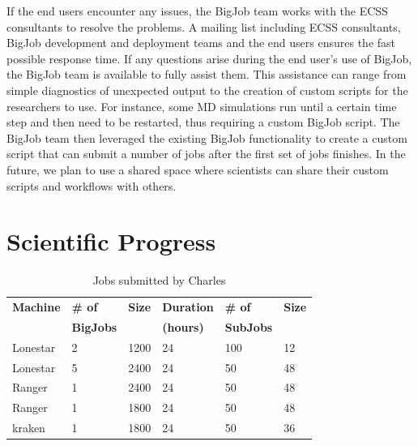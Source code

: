 \documentclass{sig-alternate}
\begin{document}
If the end users encounter any issues, the BigJob team works with the ECSS
consultants to resolve the problems. A mailing list including ECSS consultants,
BigJob development and deployment teams and the end users ensures the fast
possible response time. If any questions arise during the end user's use of
BigJob, the BigJob team is available to fully assist them. This assistance can
range from simple diagnostics of unexpected output to  the creation of
custom scripts for the researchers to use. For instance, some MD simulations
run until a certain time step and then need to be restarted, thus requiring a
custom BigJob script. The BigJob team then leveraged the existing BigJob
functionality to create a custom script that can submit a number of jobs after
the first set of jobs finishes. In the future, we plan to use a shared space
where scientists can share their custom scripts and workflows with others.

\section{Scientific Progress}


\begin{table}[h]
\begin{center}
\begin{tabular}{p{1.1cm}p{1.2cm}p{0.8cm}p{1.2cm}p{1.1cm}p{0.8cm}}
\toprule
\textbf{Machine}  & 
\textbf{\# of}    &
\textbf{Size}     & 
\textbf{Duration} & 
\textbf{\# of}    &
\textbf{Size}     \\
                  &
\textbf{BigJobs}  &
                  &
\textbf{(hours)}  &
\textbf{SubJobs}  &
                  \\ \midrule
Lonestar & 2 & 1200 & 24 & 100 & 12 \\ \midrule
Lonestar & 5 & 2400 & 24 &  50 & 48 \\ \midrule
Ranger   & 1 & 2400 & 24 &  50 & 48 \\ \midrule
Ranger   & 1 & 1800 & 24 &  50 & 48 \\ \midrule
kraken   & 1 & 1800 & 24 &  50 & 36 \\ \bottomrule
\end{tabular}
\caption{Jobs submitted by Charles}
\label{table:results}
\end{center}
\end{table}
\end{document}
